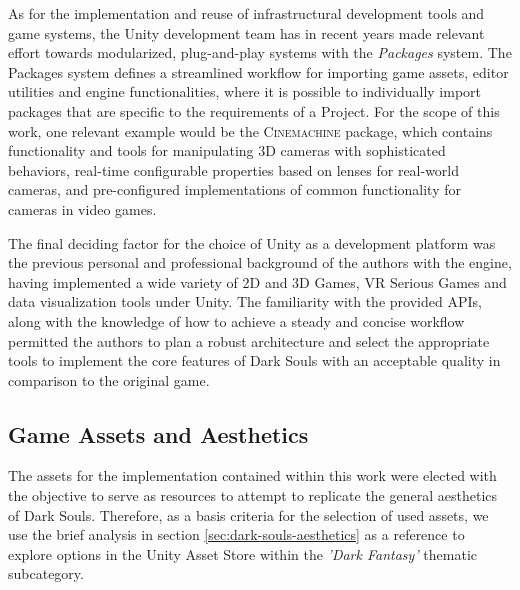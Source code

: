 As for the implementation and reuse of infrastructural development tools and game systems, the Unity development team has in recent years made relevant effort towards modularized, plug-and-play systems with the \emph{Packages} system. The Packages system defines a streamlined workflow for importing game assets, editor utilities and engine functionalities, where it is possible to individually import packages that are specific to the requirements of a Project. For the scope of this work, one relevant example would be the \textsc{Cinemachine} package, which contains functionality and tools for manipulating 3D cameras with sophisticated behaviors, real-time configurable properties based on lenses for real-world cameras, and pre-configured implementations of common functionality for cameras in video games.

The final deciding factor for the choice of Unity as a development platform was the previous personal and professional background of the authors with the engine, having implemented a wide variety of 2D and 3D Games, VR Serious Games and data visualization tools under Unity. The familiarity with the provided APIs, along with the knowledge of how to achieve a steady and concise workflow permitted the authors to plan a robust architecture and select the appropriate tools to implement the core features of Dark Souls with an acceptable quality in comparison to the original game.

\subsection{Game Assets and Aesthetics}

The assets for the implementation contained within this work were elected with the objective to serve as resources to attempt to replicate the general aesthetics of Dark Souls. Therefore, as a basis criteria for the selection of used assets, we use the brief analysis in section \ref{sec:dark-souls-aesthetics} as a reference to explore options in the Unity Asset Store within the \emph{'Dark Fantasy'} thematic subcategory.

